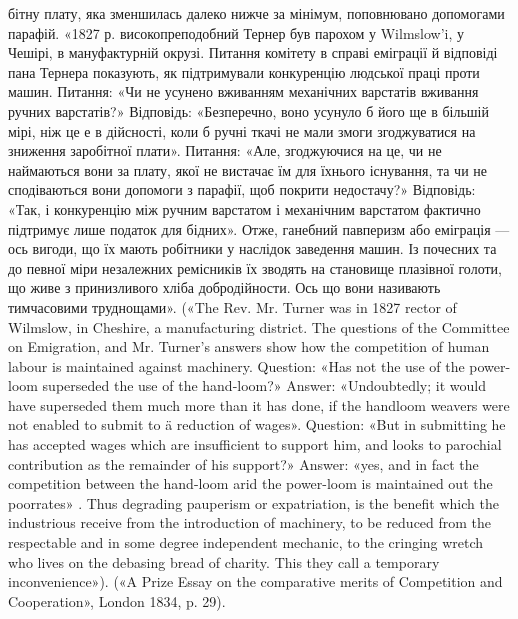 бітну плату, яка зменшилась далеко нижче за мінімум, поповнювано
допомогами парафій. «1827 р. високопреподобний Тернер був парохом у
Wilmslow’i, у Чешірі, в мануфактурній окрузі. Питання комітету в справі
еміграції й відповіді пана Тернера показують, як підтримували конкуренцію
людської праці проти машин. Питання: «Чи не усунено вживанням
механічних варстатів вживання ручних варстатів?» Відповідь: «Безперечно,
воно усунуло б його ще в більшій мірі, ніж це е в дійсності, коли б
ручні ткачі не мали змоги згоджуватися на зниження заробітної плати».
Питання: «Але, згоджуючися на це, чи не наймаються вони за плату,
якої не вистачає їм для їхнього існування, та чи не сподіваються вони
допомоги з парафії, щоб покрити недостачу?» Відповідь: «Так, і конкуренцію
між ручним варстатом і механічним варстатом фактично підтримує
лише податок для бідних». Отже, ганебний павперизм або еміграція — ось
вигоди, що їх мають робітники у наслідок заведення машин. Із почесних
та до певної міри незалежних ремісників їх зводять на становище плазівної
голоти, що живе з принизливого хліба добродійности. Ось що
вони називають тимчасовими труднощами». («The Rev. Mr. Turner was
in 1827 rector of Wilmslow, in Cheshire, a manufacturing district. The questions
of the Committee on Emigration, and Mr. Turner’s answers show
how the competition of human labour is maintained against machinery.
Question: «Has not the use of the power-loom superseded the use of the
hand-loom?» Answer: «Undoubtedly; it would have superseded them much
more than it has done, if the handloom weavers were not enabled to submit
to ä reduction of wages». Question: «But in submitting he has accepted wages
which are insufficient to support him, and looks to parochial contribution
as the remainder of his support?» Answer: «yes, and in fact the competition
between the hand-loom arid the power-loom is maintained out the poorrates»
. Thus degrading pauperism or expatriation, is the benefit which the
industrious receive from the introduction of machinery, to be reduced from
the respectable and in some degree independent mechanic, to the cringing
wretch who lives on the debasing bread of charity. This they call a temporary
inconvenience»). («A Prize Essay on the comparative merits of Competition
and Cooperation», London 1834, p. 29).

